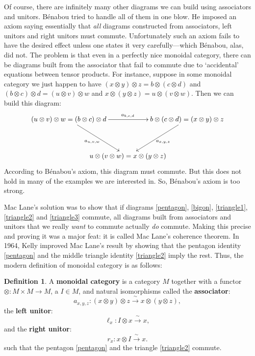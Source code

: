 \documentclass[reqno,12pt]{amsart}
\newcommand{\maps}{\colon}    %
\newcommand{\define}[1]{\textbf{\boldmath{#1}}}
\theoremstyle{definition}
\newtheorem{defn}[thm]{Definition}
\begin{document}
Of course, there are infinitely many other diagrams we can build using associators and unitors.   B\'enabou tried to handle all of them in one blow.   He imposed an axiom saying essentially that \emph{all} diagrams constructed from associators, left unitors and right unitors must commute.   Unfortunately such an axiom fails to have the desired effect unless one states it very carefully---which B\'enabou, alas, did not.  The problem is that even in a perfectly nice monoidal category, there can be diagrams built from the associator that fail to commute due to `accidental' equations between tensor products.  For instance, suppose in some monoidal category we just happen to have $(x\otimes y)\otimes z = b \otimes (c \otimes d) $ and $(b \otimes c) \otimes d = (u \otimes v) \otimes w$ and $x\otimes (y\otimes z) = u \otimes (v\otimes w)$.  Then we can build this diagram:
\[
\xy 0;/r.3pc/:
(-24,15)*+{(u \otimes v) \otimes w = (b \otimes c) \otimes d}="l";
(24,15)*+{b \otimes (c \otimes d) = (x \otimes y) \otimes z}="r";
(0,0)*+{u \otimes (v \otimes w) = x \otimes (y \otimes z)}="b";
 {\ar^{a_{b,c,d}} "l";"r"};
{\ar_{a_{u,v,w}} "l";"b"};
{\ar^{a_{x,y,z}} "r";"b"};
\endxy    
\]
According to B\'enabou's axiom, this diagram must commute.  But this does not hold in many of the examples we are interested in.   So, B\'enabou's axiom is too strong.

Mac Lane's solution \cite{M63} was to show that if diagrams \eqref{pentagon}, \eqref{bigon}, \eqref{triangle1}, \eqref{triangle2} and \eqref{triangle3} commute, all diagrams built from associators and unitors that we really \emph{want} to commute actually \emph{do} commute.  Making this precise and proving it was a major feat: it is called Mac Lane's coherence theorem.   In 1964, Kelly \cite{K64} improved Mac Lane's result by showing that the pentagon identity \eqref{pentagon} and the middle triangle identity \eqref{triangle2} imply the rest.   Thus, the modern definition of monoidal category is as follows:

\begin{defn}
 A \textbf{monoidal category} is a category $M$ together with a \define{tensor
product} functor $\otimes \maps M \times M \to M$, a \define{unit object}
$I \in M$, and natural isomorphisms
called the \textbf{associator}:
\[ a_{x,y,z} \maps (x \otimes y) \otimes z \xrightarrow{\; \sim \;} x \otimes (y \otimes z), \]
the \textbf{left unitor}:
\[ \ell_x \maps I \otimes x \xrightarrow{\; \sim \;} x , \]
and the \textbf{right unitor}:
\[ r_x \maps x \otimes I \xrightarrow{\; \sim \;} x. \]
such that the pentagon \eqref{pentagon} and the triangle \eqref{triangle2} commute.
\end{defn}
\end{document}
